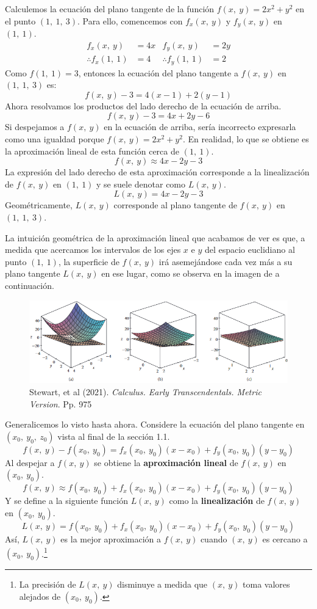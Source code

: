 \documentclass[12pt]{article}
\begin{document}
Calculemos la ecuación del plano tangente de la función $f(x, \ y) = 2x^{2} + y^{2}$ en el punto $(1, \ 1, \ 3)$. Para ello, comencemos con $f_{x}(x, \ y)$ y $f_{y}(x, \ y)$ en $(1, \ 1)$.
\begin{align*}
f_{x}(x, \ y) &= 4x & f_{y}(x, \ y) &= 2y \\
\therefore f_{x}(1, \ 1) &= 4 & \therefore f_{y}(1, \ 1) &= 2
\end{align*}
Como $f(1, \ 1) = 3$, entonces la ecuación del plano tangente a $f(x, \ y)$ en $(1, \ 1, \ 3)$ es:
\[
  f(x, \ y) - 3 = 4(x - 1) + 2(y - 1)
\]
Ahora resolvamos los productos del lado derecho de la ecuación de arriba.
\[
  f(x, \ y) - 3 = 4x + 2y - 6
\]
Si despejamos a $f(x, \ y)$ en la ecuación de arriba, sería incorrecto expresarla como una igualdad porque $f(x, \ y) = 2x^{2} + y^{2}$. En realidad, lo que se obtiene es la aproximación lineal de esta función cerca de $(1, \ 1)$.
\[
  f(x, \ y) \approx 4x - 2y - 3
\]
La expresión del lado derecho de esta aproximación corresponde a la linealización de $f(x, \ y)$ en $(1, \ 1)$ y se suele denotar como $L(x, \ y)$.
\[
  L(x, \ y) = 4x - 2y - 3
\]
Geométricamente, $L(x, \ y)$ corresponde al plano tangente de $f(x, \ y)$ en $(1, \ 1, \ 3)$.

La intuición geométrica de la aproximación lineal que acabamos de ver es que, a medida que acercamos los intervalos de los ejes $x$ e $y$ del espacio euclidiano al punto $(1, \ 1)$, la superficie de $f(x, \ y)$ irá asemejándose cada vez más a su plano tangente $L(x, \ y)$ en ese lugar, como se observa en la imagen de a continuación.

\begin{figure}[hbt!]
\centering
\includegraphics[scale=0.55]{aprox-lineal.png}
\caption{Stewart, et al (2021). \textit{Calculus. Early Transcendentals. Metric Version}. Pp. 975}
\end{figure}

Generalicemos lo visto hasta ahora. Considere la ecuación del plano tangente en $(x_{0}, \ y_{0}, \ z_{0})$ vista al final de la sección 1.1.
\[
  f(x, \ y) - f(x_{0}, \ y_{0}) = f_{x}(x_{0}, \ y_{0}) (x - x_{0}) + f_{y}(x_{0}, \ y_{0}) (y - y_{0})
\]
Al despejar a $f(x, \ y)$ se obtiene la \textbf{aproximación lineal} de $f(x, \ y)$ en $(x_{0}, \ y_{0})$.
\[
  f(x, \ y) \approx f(x_{0}, \ y_{0}) + f_{x}(x_{0}, \ y_{0}) (x - x_{0}) + f_{y}(x_{0}, \ y_{0}) (y - y_{0})
\]
Y se define a la siguiente función $L(x, \ y)$ como la \textbf{linealización} de $f(x, \ y)$ en $(x_{0}, \ y_{0})$.
\[
  L(x, \ y) = f(x_{0}, \ y_{0}) + f_{x}(x_{0}, \ y_{0}) (x - x_{0}) + f_{y}(x_{0}, \ y_{0}) (y - y_{0})
\]
Así, $L(x, \ y)$ es la mejor aproximación a $f(x, \ y)$ cuando $(x, \ y)$ es cercano a $(x_{0}, \ y_{0})$.\footnote{La precisión de $L(x, \ y)$ disminuye a medida que $(x, \ y)$ toma valores alejados de $(x_{0}, \ y_{0})$.}
\end{document}
